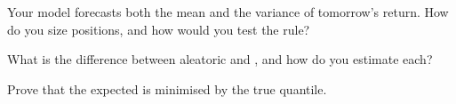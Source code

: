 \begin{interviewq}\label{iq:ml:probabilistic-models-and-uncertainty:4}
Your model forecasts both the mean and the variance of tomorrow's return. How do you size positions, and how would you
test the rule?
\end{interviewq}

\begin{interviewq}\label{iq:ml:probabilistic-models-and-uncertainty:5}
What is the difference between aleatoric and , and how do you estimate each?
\end{interviewq}

\begin{interviewq}\label{iq:ml:probabilistic-models-and-uncertainty:6}
Prove that the expected  is minimised by the true quantile.
\end{interviewq}
